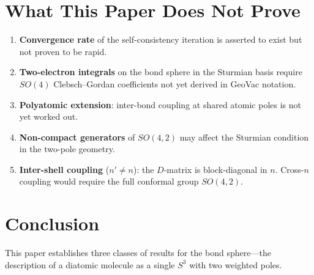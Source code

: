 \documentclass[aps,pra,twocolumn,superscriptaddress,longbibliography]{revtex4-2}
\begin{document}
\section{What This Paper Does Not Prove}
\label{sec:limitations}

\begin{enumerate}

\item \textbf{Convergence rate} of the self-consistency iteration is
asserted to exist but not proven to be rapid.

\item \textbf{Two-electron integrals} on the bond sphere in the
Sturmian basis require $SO(4)$ Clebsch--Gordan coefficients not yet
derived in GeoVac notation.

\item \textbf{Polyatomic extension}: inter-bond coupling at shared
atomic poles is not yet worked out.

\item \textbf{Non-compact generators} of $SO(4,2)$ may affect the
Sturmian condition in the two-pole geometry.

\item \textbf{Inter-shell coupling} ($n' \neq n$): the $D$-matrix is
block-diagonal in $n$.  Cross-$n$ coupling would require the full
conformal group $SO(4,2)$.

\end{enumerate}


\section{Conclusion}
\label{sec:conclusion}

This paper establishes three classes of results for the bond sphere---the
description of a diatomic molecule as a single $S^3$ with two weighted
poles.
\end{document}
